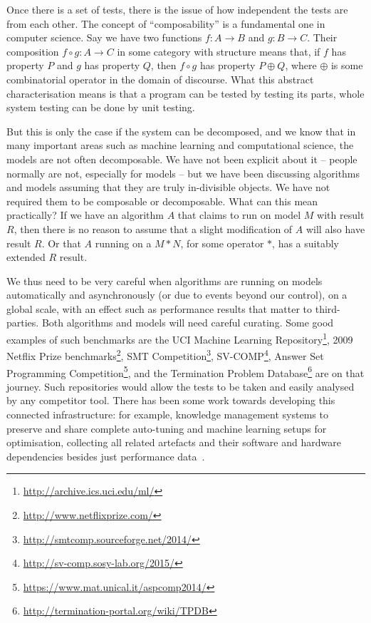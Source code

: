 \documentclass[conference]{IEEEtran}
\begin{document}
Once there is a set of tests, there is the issue of how independent
the tests are from each other.  The concept of ``composability'' is a
fundamental one in computer science.  Say we have two functions $f : A
\rightarrow B$ and $g : B \rightarrow C$. Their composition $f \circ g
: A \rightarrow C$ in some category with structure means that, if $f$
has property $P$ and $g$ has property $Q$, then $f \circ g$ has
property $P \oplus Q$, where $\oplus$ is some combinatorial operator
in the domain of discourse. What this abstract characterisation means
is that a program can be tested by testing its parts, whole system
testing can be done by unit testing.

But this is only the case if the system can be decomposed, and we know
that in many important areas such as machine learning and
computational science, the models are not often decomposable.  We have
not been explicit about it -- people normally are not, especially for
models -- but we have been discussing algorithms and models assuming
that they are truly in-divisible objects. We have not required them to
be composable or decomposable. What can this mean practically? If we
have an algorithm $A$ that claims to run on model $M$ with result $R$,
then there is no reason to assume that a slight modification of $A$
will also have result $R$. Or that $A$ running on a $M * N$, for some
operator $*$, has a suitably extended $R$ result.

We thus need to be very careful when algorithms are running on models
automatically and asynchronously (or due to events beyond our
control), on a global scale, with an effect such as performance
results that matter to third-parties. Both algorithms and models will
need careful curating. Some good examples of such benchmarks are the
UCI Machine Learning
Repository\footnote{\url{http://archive.ics.uci.edu/ml/}}, 2009
Netflix Prize benchmarks\footnote{\url{http://www.netflixprize.com/}},
SMT Competition\footnote{\url{http://smtcomp.sourceforge.net/2014/}},
SV-COMP\footnote{\url{http://sv-comp.sosy-lab.org/2015/}}, Answer Set
Programming
Competition\footnote{\url{https://www.mat.unical.it/aspcomp2014/}},
and the Termination Problem
Database\footnote{\url{http://termination-portal.org/wiki/TPDB}} are
on that journey. Such repositories would allow the tests to be taken
and easily analysed by any competitor tool. There has been some work
towards developing this connected infrastructure: for example,
knowledge management systems to preserve and share complete
auto-tuning and machine learning setups for optimisation, collecting
all related artefacts and their software and hardware dependencies
besides just performance data~\cite{fursin-et-al:2014}.
\end{document}
